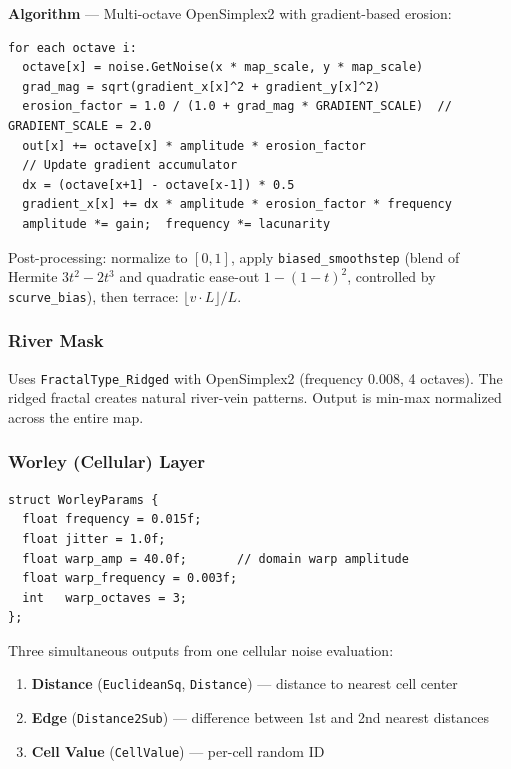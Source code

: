 \documentclass[11pt,a4paper]{article}
\begin{document}
\textbf{Algorithm} --- Multi-octave OpenSimplex2 with gradient-based erosion:

\begin{lstlisting}[caption={Gradient erosion pseudocode},numbers=none]
for each octave i:
  octave[x] = noise.GetNoise(x * map_scale, y * map_scale)
  grad_mag = sqrt(gradient_x[x]^2 + gradient_y[x]^2)
  erosion_factor = 1.0 / (1.0 + grad_mag * GRADIENT_SCALE)  // GRADIENT_SCALE = 2.0
  out[x] += octave[x] * amplitude * erosion_factor
  // Update gradient accumulator
  dx = (octave[x+1] - octave[x-1]) * 0.5
  gradient_x[x] += dx * amplitude * erosion_factor * frequency
  amplitude *= gain;  frequency *= lacunarity
\end{lstlisting}

Post-processing: normalize to $[0,1]$, apply \texttt{biased\_smoothstep} (blend of Hermite $3t^2-2t^3$ and quadratic ease-out $1-(1-t)^2$, controlled by \texttt{scurve\_bias}), then terrace: $\lfloor v \cdot L \rfloor / L$.

\subsubsection{River Mask}

Uses \texttt{FractalType\_Ridged} with OpenSimplex2 (frequency 0.008, 4 octaves). The ridged fractal creates natural river-vein patterns. Output is min-max normalized across the entire map.

\subsubsection{Worley (Cellular) Layer}

\begin{lstlisting}[caption={WorleyParams defaults}]
struct WorleyParams {
  float frequency = 0.015f;
  float jitter = 1.0f;
  float warp_amp = 40.0f;       // domain warp amplitude
  float warp_frequency = 0.003f;
  int   warp_octaves = 3;
};
\end{lstlisting}

Three simultaneous outputs from one cellular noise evaluation:
\begin{enumerate}
  \item \textbf{Distance} (\texttt{EuclideanSq}, \texttt{Distance}) --- distance to nearest cell center
  \item \textbf{Edge} (\texttt{Distance2Sub}) --- difference between 1st and 2nd nearest distances
  \item \textbf{Cell Value} (\texttt{CellValue}) --- per-cell random ID
\end{enumerate}
\end{document}
